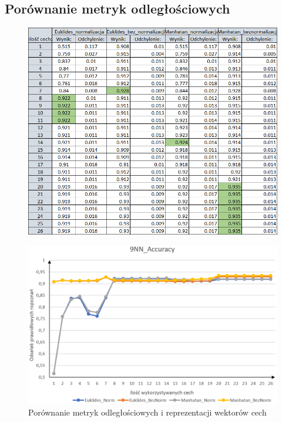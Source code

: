 \documentclass[12pt]{article}
\begin{document}
\subsection{Porównanie metryk odległościowych}
\begin{figure}[H]
	\centering
		\includegraphics[scale=0.77]{images/distance_metrics/distance_metrics_tab.png}
	
\end{figure}
\begin{figure}[H]
	\centering
		\includegraphics[scale=0.66]{images/distance_metrics/distance_metrics.png}
	\caption{Porównanie metryk odległościowych i reprezentacji wektorów cech}
\end{figure}
\end{document}
